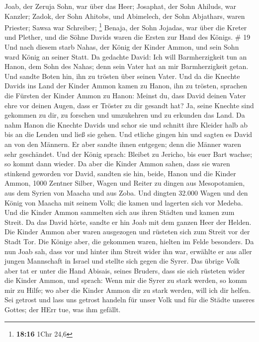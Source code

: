 Joab, der Zeruja Sohn, war über das Heer; Josaphat, der Sohn Ahiluds,
war Kanzler;  Zadok, der Sohn Ahitobs, und Abimelech, der
Sohn Abjathars, waren Priester; Sawsa war Schreiber; \footnote{\textbf{18:16}
  1Chr 24,6}  Benaja, der Sohn Jojadas, war über die Kreter
und Plether, und die Söhne Davids waren die Ersten zur Hand des Königs.
\# 19  Und nach diesem starb Nahas, der König der Kinder
Ammon, und sein Sohn ward König an seiner Statt.  Da
gedachte David: Ich will Barmherzigkeit tun an Hanon, dem Sohn des
Nahas; denn sein Vater hat an mir Barmherzigkeit getan. Und sandte Boten
hin, ihn zu trösten über seinen Vater. Und da die Knechte Davids ins
Land der Kinder Ammon kamen zu Hanon, ihn zu trösten, 
sprachen die Fürsten der Kinder Ammon zu Hanon: Meinst du, dass David
deinen Vater ehre vor deinen Augen, dass er Tröster zu dir gesandt hat?
Ja, seine Knechte sind gekommen zu dir, zu forschen und umzukehren und
zu erkunden das Land.  Da nahm Hanon die Knechte Davids und
schor sie und schnitt ihre Kleider halb ab bis an die Lenden und ließ
sie gehen.  Und etliche gingen hin und sagten es David an
von den Männern. Er aber sandte ihnen entgegen; denn die Männer waren
sehr geschändet. Und der König sprach: Bleibet zu Jericho, bis euer Bart
wachse; so kommt dann wieder.  Da aber die Kinder Ammon
sahen, dass sie waren stinkend geworden vor David, sandten sie hin,
beide, Hanon und die Kinder Ammon, 1000 Zentner Silber, Wagen und Reiter
zu dingen aus Mesopotamien, aus dem Syrien von Maacha und aus Zoba.
 Und dingten 32.000 Wagen und den König von Maacha mit
seinem Volk; die kamen und lagerten sich vor Medeba. Und die Kinder
Ammon sammelten sich aus ihren Städten und kamen zum Streit.
 Da das David hörte, sandte er hin Joab mit dem ganzen Heer
der Helden.  Die Kinder Ammon aber waren ausgezogen und
rüsteten sich zum Streit vor der Stadt Tor. Die Könige aber, die
gekommen waren, hielten im Felde besonders.  Da nun Joab
sah, dass vor und hinter ihm Streit wider ihn war, erwählte er aus aller
jungen Mannschaft in Israel und stellte sich gegen die Syrer.
 Das übrige Volk aber tat er unter die Hand Abisais, seines
Bruders, dass sie sich rüsteten wider die Kinder Ammon, 
und sprach: Wenn mir die Syrer zu stark werden, so komm mir zu Hilfe; wo
aber die Kinder Ammon dir zu stark werden, will ich dir helfen.
 Sei getrost und lass uns getrost handeln für unser Volk
und für die Städte unseres Gottes; der HErr tue, was ihm gefällt.
